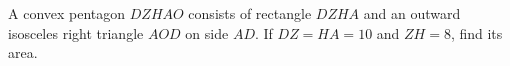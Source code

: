 A convex pentagon $DZHAO$ consists of rectangle $DZHA$ and an outward isosceles right triangle $AOD$ on side $AD$. If $DZ=HA=10$ and $ZH=8$, find its area.
